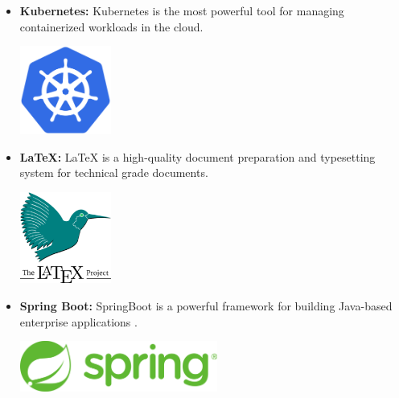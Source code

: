\begin{itemize}
    \item \textbf{Kubernetes:} \newline Kubernetes \cite{Kubernetes} is the most powerful tool for managing containerized workloads in the cloud. \newline
          \begin{minipage}{\linewidth}
              \centering
              \includegraphics[width=3cm]{src/assets/logos/kubernetes_512x512.png}
          \end{minipage}
    \item \textbf{LaTeX:} \newline LaTeX \cite{latex-project} is a high-quality document preparation and typesetting system for technical grade documents. \newline \newline
          \begin{minipage}{\linewidth}
              \centering
              \includegraphics[width=3cm]{src/assets/logos/latex_200x200.png}
          \end{minipage}
    \item \textbf{Spring Boot:} \newline SpringBoot \cite{SpringBoot} is a powerful framework for building Java-based enterprise applications
. \newline \newline
          \begin{minipage}{\linewidth}
              \centering
              \includegraphics[width=6.5cm]{src/assets/logos/Springboot.png}

\end{minipage}
\end{itemize}
